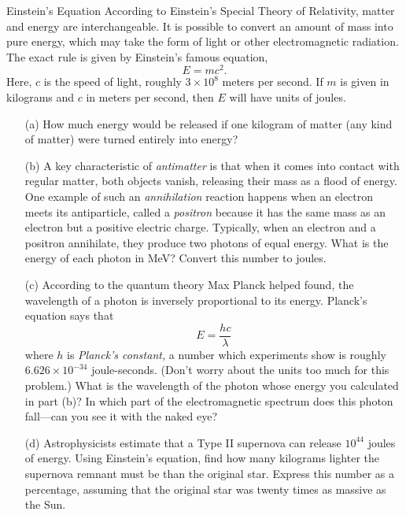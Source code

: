 \documentclass[12pt]{article}
\begin{document}
\begin{probdesc}{8}{Einstein's Equation}
According to Einstein's Special Theory of Relativity, matter and
energy are interchangeable.  It is possible to convert an amount of
mass into pure energy, which may take the form of light or other
electromagnetic radiation.  The exact rule is given by Einstein's
famous equation,
\begin{equation}
E = mc^2.
\end{equation}
Here, $c$ is the speed of light, roughly $3\times10^8$ meters per
second.  If $m$ is given in kilograms and $c$ in meters per second,
then $E$ will have units of joules.
\begin{enumerate}
\item[(a)] How much energy would be released if one kilogram of matter (any
  kind of matter) were turned entirely into energy?

\item[(b)] A key characteristic of {\em antimatter} is that when it comes
  into contact with regular matter, both objects vanish, releasing
  their mass as a flood of energy.  One example of such an {\em
  annihilation} reaction happens when an electron meets its
  antiparticle, called a {\em positron} because it has the same mass
  as an electron but a positive electric charge.  Typically, when an
  electron and a positron annihilate, they produce two photons of
  equal energy.  What is the energy of each photon in MeV?  Convert
  this number to joules.

\item[(c)] According to the quantum theory Max Planck helped found, the
  wavelength of a photon is inversely proportional to its energy.
  Planck's equation says that
  \begin{equation}
    E = \frac{hc}{\lambda}
  \end{equation}
  where $h$ is {\em Planck's constant,} a number which experiments
  show is roughly $6.626\times10^{-34}$ joule-seconds.  (Don't worry
  about the units too much for this problem.)  What is the wavelength
  of the photon whose energy you calculated in part (b)?  In which
  part of the electromagnetic spectrum does this photon fall---can you
  see it with the naked eye?

\item[(d)] Astrophysicists estimate that a Type II supernova can
  release $10^{44}$ joules of energy.  Using Einstein's equation, find
  how many kilograms lighter the supernova remnant must be than the
  original star.  Express this number as a percentage, assuming that
  the original star was twenty times as massive as the Sun.
\end{enumerate}
\end{probdesc}
\end{document}
